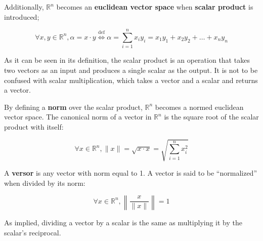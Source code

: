 \documentclass{article}
\renewcommand{\Bbb}{\mathbb}
\begin{document}
Additionally, $\Bbb R^n$ becomes an \textbf{euclidean vector space} when \textbf{scalar product} is introduced;

\begin{equation}
\forall x, y \in \Bbb R^n, \alpha = x \cdot y \overset{\text{def}}{\Longleftrightarrow} \alpha = \sum\limits_{i=1}^{n} x_i y_i = x_1 y_1 + x_2 y_2 + \ldots + x_n y_n
\end{equation}

As it can be seen in its definition, the scalar product is an operation that takes two vectors as an input and produces a single scalar as the output. It is not to be confused with scalar multiplication, which takes a vector and a scalar and returns a vector.

By defining a \textbf{norm} over the scalar product, $\Bbb R^n$ becomes a normed euclidean vector space. The canonical norm of a vector in $\Bbb R^n$ is the square root of the scalar product with itself:

\begin{equation}
\forall x \in \Bbb R^n, \|x\| = \sqrt{x \cdot x} = \sqrt{ \sum\limits_{i=1}^{n} x_i^2 }
\end{equation}

A \textbf{versor} is any vector with norm equal to 1. A vector is said to be ``normalized'' when divided by its norm:

\begin{equation}
\forall x \in \Bbb R^n, \left\| \frac{x}{\|x\|} \right\| = 1
\end{equation}

As implied, dividing a vector by a scalar is the same as multiplying it by the scalar's reciprocal.
\end{document}
